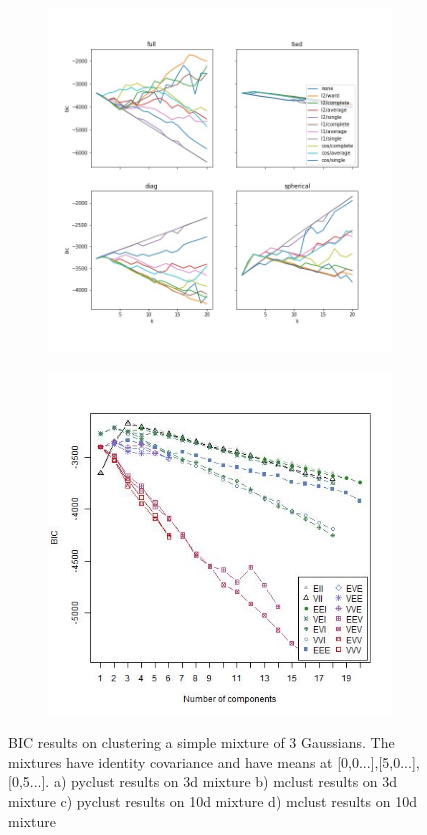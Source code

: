 \documentclass{article}
\begin{document}
\begin{figure}[h!]
\begin{subfigure}[b]{0.35\linewidth}
\caption{}
\end{subfigure} 
\begin{subfigure}[b]{0.35\linewidth}
  \includegraphics[width=\linewidth]{highd_python_bicplot.jpg}
\caption{}
\end{subfigure}
\begin{subfigure}[b]{0.35\linewidth}
  \includegraphics[width=\linewidth]{highd_r_bicplot.jpg}
\caption{}
\end{subfigure} 

\caption{BIC results on clustering a simple mixture of 3 Gaussians. The mixtures have identity covariance and have means at [0,0...],[5,0...],[0,5...]. a) pyclust results on 3d mixture b) mclust results on 3d mixture c) pyclust results on 10d mixture d) mclust results on 10d mixture}
\end{figure}
\end{document}

